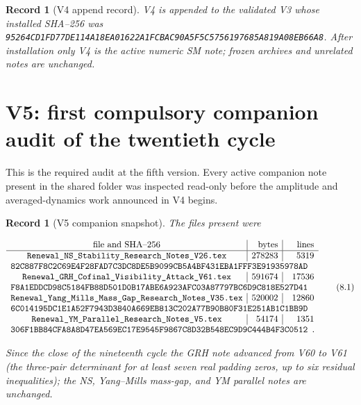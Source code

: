 \documentclass[11pt]{article}
\newtheorem{record}[theorem]{Record}
\theoremstyle{remark}
\begin{document}
\begin{record}[V4 append record]
\label{rec:v20v4}
V4 is appended to the validated V3 whose installed SHA--256 was
\texttt{95264CD1FD77DE114A18EA01622A1FCBAC90A5F5C5756197685A819A08EB66A8}.
After installation only V4 is the active numeric SM note; frozen
archives and unrelated notes are unchanged.
\end{record}


\section{V5: first compulsory companion audit of the twentieth cycle}
\label{sec:v20v5}

This is the required audit at the fifth version.  Every active
companion note present in the shared folder was inspected read-only
before the amplitude and averaged-dynamics work announced in V4
begins.

\begin{record}[V5 companion snapshot]
\label{rec:v20v5-snapshot}
The files present were

\[
\begin{array}{c|r|r}
\hbox{file and SHA--256}&\hbox{bytes}&\hbox{lines}\\ \hline
\texttt{Renewal\_NS\_Stability\_Research\_Notes\_V26.tex}
&278283&5319\\
\multicolumn{3}{l}{
\texttt{82C887F8C2C69E4F28FAD7C3DC8DE5B9099CB5A4BF431EBA1FFF3E91935978AD}}
\\
\texttt{Renewal\_GRH\_Cofinal\_Visibility\_Attack\_V61.tex}
&591674&17536\\
\multicolumn{3}{l}{
\texttt{F8A1EDDCD98C5184FB88D501D0B17ABE6A923AFC03A87797BC6D9C818E527D41}}
\\
\texttt{Renewal\_Yang\_Mills\_Mass\_Gap\_Research\_Notes\_V35.tex}
&520002&12860\\
\multicolumn{3}{l}{
\texttt{6C014195DC1E1A52F7943D3840A669EB813C202A77B90B80F31E251AB1C1BB9D}}
\\
\texttt{Renewal\_YM\_Parallel\_Research\_Notes\_V5.tex}
&54174&1351\\
\multicolumn{3}{l}{
\texttt{306F1BB84CFA8A8D47EA569EC17E9545F9867C8D32B548EC9D9C444B4F3C0512}}.
\end{array}                                                     \tag{8.1}
\]

Since the close of the nineteenth cycle the GRH note advanced from
V60 to V61 (the three-pair determinant for at least seven real
padding zeros, up to six residual inequalities); the NS, Yang--Mills
mass-gap, and YM parallel notes are unchanged.
\end{record}
\end{document}
